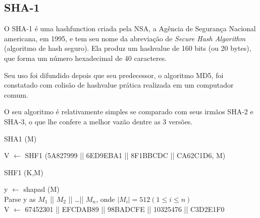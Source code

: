 
\subsection*{SHA-1}

O SHA-1 é uma \gls*{hashfunction} criada pela NSA, a Agência de Segurança Nacional
americana, em 1995, e tem seu nome da abreviação de \emph{Secure Hash Algorithm}
(algoritmo de hash seguro). Ela produz um \gls*{hashvalue} de 160 bits (ou 20 bytes),
que forma um número hexadecimal de 40 caracteres.

Seu uso foi difundido depois que seu predecessor, o algoritmo MD5, foi constatado
com colisão de \gls*{hashvalue} prática realizada em um computador comum.

O seu algoritmo é relativamente simples se comparado com seus irmãos SHA-2 e SHA-3, o
que lhe confere a melhor vazão dentre as 3 versões.

\begin{algorithm}
    \caption{SHA1 (M)}
    \label{sha1}
    V $\leftarrow$ SHF1 (5A827999 || 6ED9EBA1 || 8F1BBCDC || CA62C1D6, M)
\end{algorithm}

\begin{algorithm}
    \caption{SHF1 (K,M)}
    y $\leftarrow$ shapad (M) \\
    Parse y as $M_1$ || $M_2$ || \ldots || $M_n$, onde $|M_i| = 512 (1 \leq i \leq n)$\\
    V $\leftarrow$ 67452301 || EFCDAB89 || 98BADCFE || 10325476 || C3D2E1F0 \\
\end{algorithm}



\begin{comment}

    \FOR{$i=0$ to $79$}
    \IF{$0 \leq i \leq 19$}
    \STATE $T = a \lll 5 + f_{if}(b,c,d) + e + W[i] + $K0
    \ELSIF{$20 \leq i \leq 39$}
    \STATE $T = a \lll 5 + f_{xor}(b,c,d) + e + W[i] + $K1
    \ELSIF{$40 \leq i \leq 59$}
    \STATE $T = a \lll 5 + f_{maj}(b,c,d) + e + W[i] + $K2
    \ELSIF{$60 \leq i \leq 79$}
    \STATE $T = a \lll 5 + f_{xor}(b,c,d) + e + W[i] + $K3
    \ENDIF
    \STATE $e = d$, $d = c$, $c = b \lll 30$, $b = a$, $a = T$
    \ENDFOR
    \STATE $H_0 = a + H_0$, $H_1 = b + H_1$, $H_2 = c + H_2$, $H_3 = d + H_3$, $H_4 = e + H_4$
    \ENDFOR
    \RETURN concat($H_0$, $H_1$, $H_2$, $H_3,$ $H_4$)

    \SetAlgoLined
    \LinesNumbered
    \Dados{audio, tamanho, nivel, filtro, ch}
    \Entrada{i, j, inicio, comprimento}
    \BlankLine
    $inicio \leftarrow 0$\;
      $comprimento \leftarrow tamanho$\;
    \Para{$i \leftarrow 0$ \Ate $i<nivel$}{
        $inicio \leftarrow 0$\;
    $comprimento \leftarrow tamanho/2^{i-1}$\;
    \Para{$j \leftarrow 0$ \Ate $j<2^{i-1}$}{
        \eSe{j é par}{
                transformada\_wavelet(audio[inicio],comprimento, 1,'n', filtro, ch)\;
            }{
                transformada\_wavelet(audio[inicio],comprimento, 1,'i', filtro, ch)\;
            }
        }
    }
\end{comment}